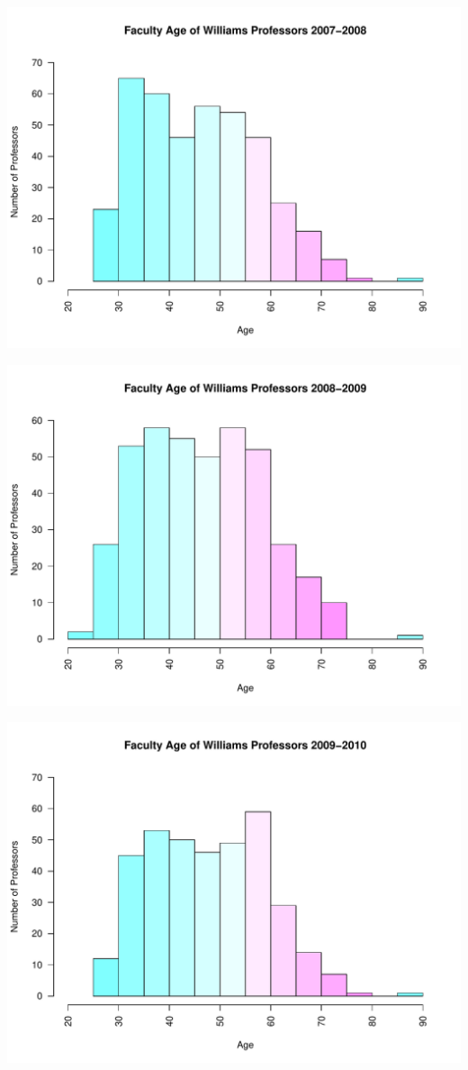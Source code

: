 \documentclass[12pt,a4paper]{article}\usepackage[]{graphicx}\usepackage[]{color}
\makeatletter
\def\maxwidth{ %
  \ifdim\Gin@nat@width>\linewidth
    \linewidth
  \else
    \Gin@nat@width
  \fi
}
\newenvironment{knitrout}{}{} %
\theoremstyle{definition}
\makeatother
\begin{document}
\begin{knitrout}
\includegraphics[width=\maxwidth]{figure/unnamed-chunk-9-4} 

\includegraphics[width=\maxwidth]{figure/unnamed-chunk-9-5} 

\includegraphics[width=\maxwidth]{figure/unnamed-chunk-9-6} 


\end{knitrout}
\end{document}
